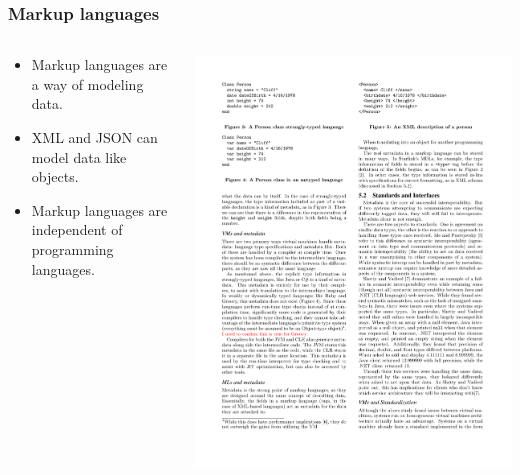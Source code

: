 \documentclass{beamer}
\newcommand{\linespace}{\vskip 0.25cm}
\begin{document}
\begin{frame}
  \frametitle{Markup languages}
  
  \begin{columns}
  \begin{column}{0.5\textwidth}
  \begin{itemize}
	\item Markup languages are a way of modeling data.
	\item XML and JSON can model data like objects.
	\item Markup languages are independent of programming languages.
  \end{itemize}
  \end{column}

  \begin{column}{0.5\textwidth}
   \includegraphics[scale=1]{graphics/XMLCliff.pdf}
   \linespace
   \linespace

\end{column}
\end{columns}
\end{frame}
\end{document}
